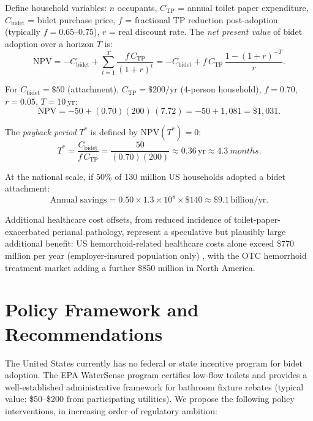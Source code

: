 \documentclass[aps,prfluids,reprint,amsmath,amssymb,floatfix]{revtex4-2}
\begin{document}
Define household variables: $n$ occupants, $C_\mathrm{TP}$ = annual toilet
paper expenditure, $C_\mathrm{bidet}$ = bidet purchase price, $f$ = fractional
TP reduction post-adoption (typically $f = 0.65$--$0.75$), $r$ = real discount
rate. The \emph{net present value} of bidet adoption over a horizon $T$ is:
\begin{equation}
    \mathrm{NPV} = -C_\mathrm{bidet} + \sum_{t=1}^{T}\frac{f\,C_\mathrm{TP}}{(1+r)^t}
    = -C_\mathrm{bidet} + f\,C_\mathrm{TP}\,\frac{1-(1+r)^{-T}}{r}.
    \label{eq:npv}
\end{equation}

For $C_\mathrm{bidet} = \$50$ (attachment), $C_\mathrm{TP} = \$200/\mathrm{yr}$
(4-person household), $f = 0.70$, $r = 0.05$, $T = 10\,\mathrm{yr}$:
\begin{equation}
    \mathrm{NPV} = -50 + (0.70)(200)\,(7.72) = -50 + 1{,}081 = \$1{,}031.
    \label{eq:npvval}
\end{equation}

The \emph{payback period} $T^*$ is defined by $\mathrm{NPV}(T^*) = 0$:
\begin{equation}
    T^* = \frac{C_\mathrm{bidet}}{f\,C_\mathrm{TP}}
    = \frac{50}{(0.70)(200)} \approx 0.36\,\mathrm{yr} \approx
    \SI{4.3}{months}.
    \label{eq:payback}
\end{equation}

At the national scale, if 50\% of 130 million US households adopted a
bidet attachment:
\begin{equation}
    \mathrm{Annual\;savings} = 0.50 \times 1.3 \times 10^8 \times \$140
    \approx \$9.1\,\mathrm{billion/yr}.
\end{equation}

Additional healthcare cost offsets, from reduced incidence of toilet-paper-exacerbated
perianal pathology, represent a speculative but plausibly large additional
benefit: US hemorrhoid-related healthcare costs alone exceed \$770 million
per year (employer-insured population only) \citep{Peery2014}, with the OTC
hemorrhoid treatment market adding a further \$850 million in North America.

\section{Policy Framework and Recommendations}
\label{sec:policy}

The United States currently has no federal or state incentive program for
bidet adoption. The EPA WaterSense program certifies low-flow toilets and
provides a well-established administrative framework for bathroom fixture
rebates (typical value: \$50--\$200 from participating utilities). We propose
the following policy interventions, in increasing order of regulatory ambition:
\end{document}
